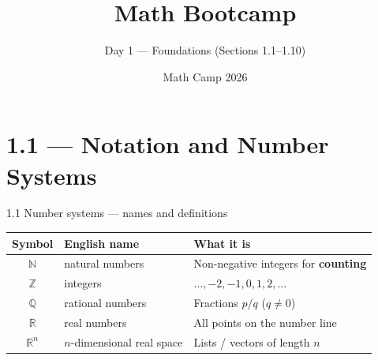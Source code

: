 \documentclass[11pt,aspectratio=169]{beamer}
\title{Math Bootcamp}
\subtitle{Day 1 --- Foundations (Sections 1.1--1.10)}
\author{Math Camp 2026}
\date{}
\begin{document}
\begin{frame}
  \titlepage
\end{frame}

\section{1.1 --- Notation and Number Systems}

\begin{frame}{1.1 Number systems --- names and definitions}
  \small
  \begin{tabular}{@{}clp{}@{}}
    \toprule
    \textbf{Symbol} & \textbf{English name} & \textbf{What it is} \\
    \midrule
    $\mathbb{N}$ & natural numbers & Non-negative integers for \textbf{counting} \\
    $\mathbb{Z}$ & integers & $\ldots,-2,-1,0,1,2,\ldots$ \\
    $\mathbb{Q}$ & rational numbers & Fractions $p/q$ ($q\ne0$) \\
    $\mathbb{R}$ & real numbers & All points on the number line \\
    $\mathbb{R}^n$ & $n$-dimensional real space & Lists / vectors of length $n$ \\
    \bottomrule
  \end{tabular}

  \medskip
  \begin{center}
  \end{center}
\end{frame}
\end{document}
